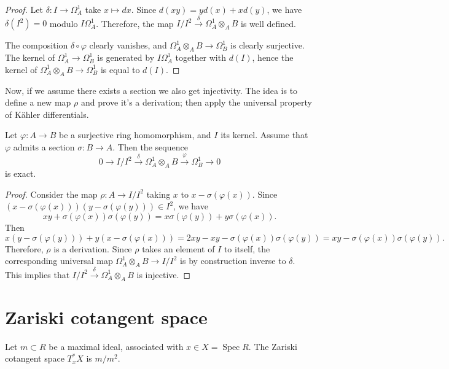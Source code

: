 \begin{proof}
Let $\delta:I\to\Omega^1_A$ take
$x\mapsto dx$. Since
$d(xy)=yd(x)+xd(y)$, we have
$\delta(I^2)=0$ modulo $I\Omega^1_A$.
Therefore, the map
$I/I^2\xrightarrow{\delta}
\Omega^1_A\otimes_A B$ is well defined.

The composition $\delta\circ\varphi$
clearly vanishes, and
$\Omega^1_A\otimes_A B\to\Omega^1_B$ is
clearly surjective. The kernel of
$\Omega^1_A\to\Omega^1_B$ is generated by
$I\Omega^1_A$ together with $d(I)$, hence
the kernel of
$\Omega^1_A\otimes_A B\to\Omega^1_B$
is equal to $d(I)$.
\end{proof}

\noindent
Now, if we assume there exists a section
we also get injectivity. The idea
is to define a new map
$\rho$ and prove it's a derivation;
then apply the universal property
of Kähler differentials.

\begin{lemma}
\label{lemma-exact-sequence-kahler-differentials-section}
Let $\varphi:A\to B$ be a surjective ring
homomorphism, and $I$ its kernel. Assume
that $\varphi$ admits a section
$\sigma:B\to A$. Then the sequence
$$
0\to I/I^2\xrightarrow{\delta}
\Omega^1_A\otimes_A B
\xrightarrow{\varphi}
\Omega^1_B\to 0
$$
is exact.
\end{lemma}

\begin{proof}
Consider the map $\rho:A\to I/I^2$ taking
$x$ to $x-\sigma(\varphi(x))$. Since
$(x-\sigma(\varphi(x)))(y-\sigma(\varphi(y)))\in I^2$,
we have
$$
xy+\sigma(\varphi(x))\sigma(\varphi(y))
= x\sigma(\varphi(y))
+y\sigma(\varphi(x)).
$$
Then
$$
x(y-\sigma(\varphi(y)))
+y(x-\sigma(\varphi(x)))
= 2xy-xy-\sigma(\varphi(x))\sigma(\varphi(y))
=xy-\sigma(\varphi(x))\sigma(\varphi(y)).
$$
Therefore, $\rho$ is a derivation.
Since $\rho$ takes an element of $I$ to
itself, the corresponding universal map
$\Omega^1_A\otimes_A B\to I/I^2$ is by
construction inverse to $\delta$.
This implies that
$I/I^2\xrightarrow{\delta}
\Omega^1_A\otimes_A B$ is injective.
\end{proof}

\section{Zariski cotangent space}
\label{section-zariski-cotangent-space}

\begin{definition}
\label{definition-zariski-cotangent-space}
Let $m \subset R$ be a maximal ideal,
associated with $x \in X = \operatorname{Spec} R$.
The Zariski cotangent space $T_x^\ast X$
is $m/m^2$.
\end{definition}

